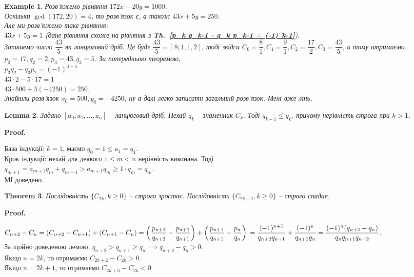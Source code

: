 \documentclass[a4paper, 10pt]{article}
\makeatletter
\theoremstyle{theoremdd}
\newtheorem{theorem}{Theorem}[subsection]
\theoremstyle{theoremdd}
\theoremstyle{theoremdd}
\theoremstyle{theoremdd}
\newtheorem{example}[theorem]{Example}
\theoremstyle{theoremdd}
\theoremstyle{theoremdd}
\theoremstyle{theoremdd}
\newtheorem{lemma}[theorem]{Lemma}
\theoremstyle{theoremdd}
\renewenvironment{proof}[1][Proof.\\]{\par
\pushQED{\hfill \qed}%
\normalfont \topsep6\p@\@plus6\p@\relax
\trivlist
\item\relax
{\bfseries
#1\@addpunct{.}}\hspace\labelsep\ignorespaces
}{%
\popQED\endtrivlist\@endpefalse
}
\newcommand\thref[1]{\textbf{Th.~\ref{#1}}}
\makeatother
\begin{document}
\begin{example}
Розв'яжемо рівняння $172x+20y=1000$.\\
Оскільки $\gcd(172,20) = 4$, то розв'язок є, а також $43x + 5y  =250$.\\
Але ми розв'яжемо таке рівняння:\\
$43x + 5y = 1$ (дане рівняння схоже на рівняння з \thref{p_k q_k-1 - q_k p_k-1 = (-1)^k-1}).\\
Запишемо число $\dfrac{43}{5}$ як ланцюговий дріб. Це буде $\dfrac{43}{5} = [8;1,1,2]$, тоді звідси $C_0 = \dfrac{8}{1}, C_1 = \dfrac{9}{1}, C_2 = \dfrac{17}{2}, C_3 = \dfrac{43}{5}$, а тому отримаємо $p_2 = 17, q_2 = 2, p_3 = 43, q_3 = 5$. За попередньою теоремою,\\
$p_3q_2 - q_3p_2 = (-1)^{3-1}$\\
$43 \cdot 2 - 5 \cdot 17 = 1$\\
$43 \cdot 500 + 5 (-4250) = 250$.\\
Знайшли розв'язок $x_0 = 500, y_0 = -4250$, ну а далі легко записати загальинй розв'язок. Мені вже лінь.
\end{example}

\begin{lemma}
Задано $[a_0;a_1,\dots,a_n]$ -- ланцюговий дріб. Нехай $q_k$ -- знаменник $C_k$. Тоді $q_{k-1} \leq q_k$, причому нерівність строга при $k > 1$.
\end{lemma}

\begin{proof}
База індукції: $k = 1$, маємо $q_0 = 1 \leq a_1 = q_1$.\\
Крок індукції: нехай для деякого $1 \leq m < n$ нерівність виконана. Тоді\\
$q_{m+1} = a_{m+1}q_m + q_{m-1} > a_{m+1}q_m \geq 1 \cdot q_m = q_m$.\\
МІ доведено.
\end{proof}

\begin{theorem}
Послідовність $\{C_{2k}, k \geq 0\}$ -- строго зростає. Послідовність $\{C_{2k+1}, k \geq 0\}$ -- строго спадає.
\end{theorem}

\begin{proof}
$C_{n+2}-C_n = (C_{n+2}-C_{n+1}) + (C_{n+1}-C_n) = \left(\dfrac{p_{n+2}}{q_{n+2}} - \dfrac{p_{n+1}}{q_{n+1}}\right) + \left(\dfrac{p_{n+1}}{q_{n+1}} - \dfrac{p_{n}}{q_{n}}\right) \\
= \dfrac{(-1)^{n+1}}{q_{n+2}q_{n+1}} + \dfrac{(-1)^n}{q_{n+1}q_n} = \dfrac{(-1)^n(q_{n+2}-q_n)}{q_n q_{n+1} q_{n+2}}$.\\
За щойно доведеною лемою, $q_{n+2} > q_{n+1} \geq q_n \implies q_{n+2} - q_n > 0$.\\
Якщо $n = 2k$, то отримаємо $C_{2k+2} - C_{2k} > 0$.\\
Якщо $n = 2k+1$, то отримаємо $C_{2k+3} - C_{2k} < 0$.
\end{proof}
\end{document}
